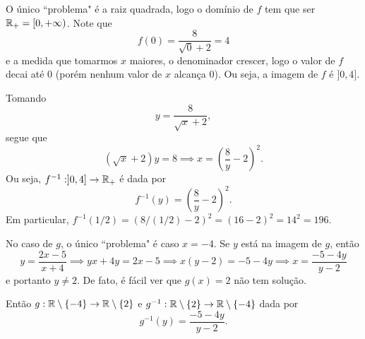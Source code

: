 O único ``problema" é a raiz quadrada, logo o domínio de $f$ tem que ser $\mathbb{R}_+=[0,+\infty)$.
Note que
\[
	f(0)=\frac{8}{\sqrt{0}+2}=4
\]
e a medida que tomarmos $x$ maiores, o denominador crescer, logo o valor de $f$ decai até 0 (porém nenhum valor de $x$
alcança 0).
Ou seja, a imagem de $f$ é $]0,4]$.

Tomando
\[
	y=\frac{8}{\sqrt{x}+2},
\]
segue que
\[
	(\sqrt{x}+2)y=8\implies x=\left(\frac{8}{y}-2\right)^2.
\]
Ou seja, $f^{-1}:]0,4]\rightarrow\mathbb{R}_+$ é dada por
\[
	f^{-1}(y)=\left(\frac{8}{y}-2\right)^2.
\]
Em particular, $f^{-1}(1/2)=(8/(1/2)-2)^2=(16-2)^2=14^2=196.$

No caso de $g$, o único ``problema" é caso $x=-4$.
Se $y$ está na imagem de $g$, então
\[
	y=\frac{2x-5}{x+4}\implies yx+4y=2x-5\implies x(y-2)=-5-4y\implies x=\frac{-5-4y}{y-2}
\]
e portanto $y\not=2$.
De fato, é fácil ver que $g(x)=2$ não tem solução.

Então $g:\mathbb{R}\setminus\{-4\}\rightarrow\mathbb{R}\setminus\{2\}$ e $g^{-1}:\mathbb{R}\setminus\{2\}\rightarrow\mathbb{R}\setminus\{-4\}$ dada por
\[
	g^{-1}(y)=\frac{-5-4y}{y-2}.
\]
